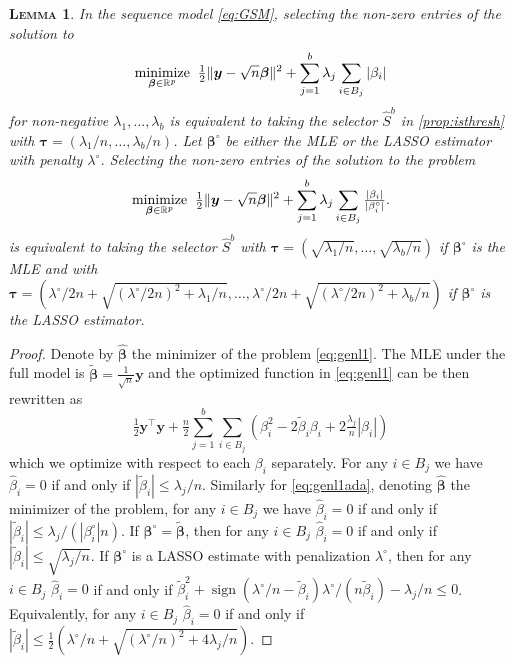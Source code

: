 \documentclass[bj,authoryear]{imsart}
\theoremstyle{plain}
\newtheorem{lem}[thm]{\textsc{Lemma}}
\newcommand{\R}{\mathbb{R}}
\newcommand{\bs}{\boldsymbol}
\begin{document}
\begin{lem}\label{lem:l1isthreshold}
	In the sequence model \eqref{eq:GSM}, selecting the non-zero entries  of the solution to 
\begin{equation}\label{eq:genl1}
	\underset{\bs \beta \in \R^p}{\rm minimize} \;\;\tfrac12\|\bs y-\sqrt{n}\bs\beta\|^2+\sum_{j=1}^b \lambda_j \sum_{i \in B_j}|\beta_{i}|
\end{equation}
for non-negative $\lambda_1,\ldots,\lambda_b$  is equivalent to taking the selector $\hat S^{b}$ in \eqref{prop:isthresh} with $\bs \tau=(\lambda_1/n,\ldots,\lambda_b/n)$. Let $\bs\beta^\circ$ be either the MLE or the LASSO estimator with penalty $\lambda^\circ$. Selecting the non-zero entries of the solution to the problem
\begin{equation}\label{eq:genl1ada}
	\underset{\bs \beta \in \R^p}{\rm minimize} \;\;\tfrac12\|\bs y-\sqrt{n}\bs\beta\|^2+\sum_{j=1}^b \lambda_j \sum_{i \in B_j}\tfrac{|\beta_{i}|}{|\beta_i^\circ|}.
\end{equation}
is equivalent to taking the selector $\hat S^{b}$ with $\bs \tau=(\sqrt{\lambda_1/n},\ldots,\sqrt{\lambda_b/n})$ if $\bs\beta^\circ$ is the MLE and with $\bs \tau=(\lambda^\circ/2n+\sqrt{(\lambda^\circ/2n)^2+\lambda_1/n},\ldots,\lambda^\circ/2n+\sqrt{(\lambda^\circ/2n)^2+\lambda_b/n})$ if $\bs\beta^\circ$ is the LASSO estimator.
\end{lem}

\begin{proof}
    Denote by $\hat{\bs \beta}$ the minimizer of the problem \eqref{eq:genl1}. The MLE under the full model is $\tilde{\bs\beta}=\tfrac{1}{\sqrt{n}} \bs y$ and the optimized function in \eqref{eq:genl1} can be then rewritten as
	$$
	\tfrac{1}{2}\bs y^{\top}\bs y +\tfrac{n}{2}\sum_{j=1}^b\sum_{i\in B_j}\left(\beta_i^2-2\tilde\beta_i\beta_i+2\tfrac{\lambda_j}{n}|\beta_i|\right)
	$$
	which we optimize with respect to each $\beta_i$ separately. For any $i\in B_j$ we have $\hat\beta_i=0$ if and only if $|\tilde \beta_i|\leq \lambda_j/n$. Similarly  for \eqref{eq:genl1ada}, denoting $\hat{\bs \beta}$ the minimizer of the problem, for any $i\in B_j$ we have $\hat\beta_i=0$ if and only if $|\tilde \beta_i|\leq \lambda_j/(|\beta^{\circ}_i|n)$. If $\bs \beta^{\circ}= \tilde{\bs\beta}$, then for any $i\in B_j$ $\hat{\beta}_i = 0$ if and only if $|\tilde \beta_i|\leq \sqrt{\lambda_j/n}$. If $\bs\beta^\circ$ is a LASSO estimate with penalization $\lambda^\circ$, then for any $i\in B_j$ 
 $\hat{\beta}_i = 0$ if and only if $\tilde{\beta}^2_i + \operatorname{sign}(\lambda^{\circ}/n-\tilde{\beta}_i)\lambda^\circ/(n\tilde{\beta}_i)-\lambda_j/n \leq 0$. Equivalently, for any $i\in B_j$ 
 $\hat{\beta}_i = 0$ if and only if $|\tilde{\beta}_ i| \leq  \tfrac{1}{2}\left(\lambda^\circ/n+\sqrt{(\lambda^\circ/n)^2+4 \lambda_j/n}\right)$.
\end{proof}
\end{document}
